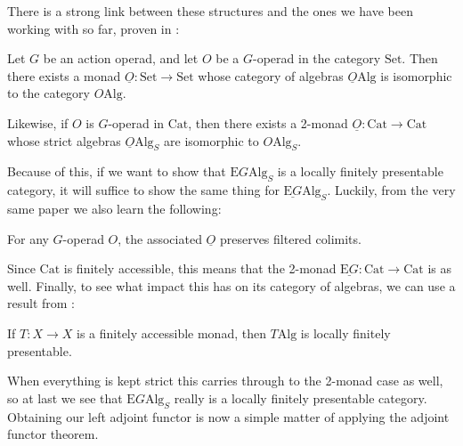 There is a strong link between these structures and the ones we have been working with so far, proven in \cite{ogge}:

\begin{prop} Let $G$ be an action operad, and let $O$ be a $G$-operad in the category $\mathrm{Set}$. Then there exists a monad $\underline{O}: \mathrm{Set} \to \mathrm{Set}$ whose category of algebras $\underline{O}\mathrm{Alg}$ is isomorphic to the category $O\mathrm{Alg}$.

Likewise, if $O$ is $G$-operad in $\mathrm{Cat}$, then there exists a 2-monad $\underline{O}: \mathrm{Cat} \to \mathrm{Cat}$ whose strict algebras $\underline{O}\mathrm{Alg}_S$ are isomorphic to $O\mathrm{Alg}_S$.
\end{prop}

Because of this, if we want to show that $\mathrm{E}G\mathrm{Alg}_S$ is a locally finitely presentable category, it will suffice to show the same thing for $\underline{\mathrm{E}G}\mathrm{Alg}_S$. Luckily, from the very same paper we also learn the following:

\begin{prop} For any $G$-operad $O$, the associated $\underline{O}$ preserves filtered colimits. \end{prop}

Since $\mathrm{Cat}$ is finitely accessible, this means that the 2-monad $\underline{\mathrm{E}G}: \mathrm{Cat} \to \mathrm{Cat}$ is as well. Finally, to see what impact this has on its category of algebras, we can use a result from \cite{lpac}:

\begin{prop} If $T: X \to X$ is a finitely accessible monad, then $T\mathrm{Alg}$ is locally finitely presentable. \end{prop}

When everything is kept strict this carries through to the 2-monad case as well, so at last we see that $\mathrm{E}G\mathrm{Alg}_S$ really is a locally finitely presentable category. Obtaining our left adjoint functor is now a simple matter of applying the adjoint functor theorem.

